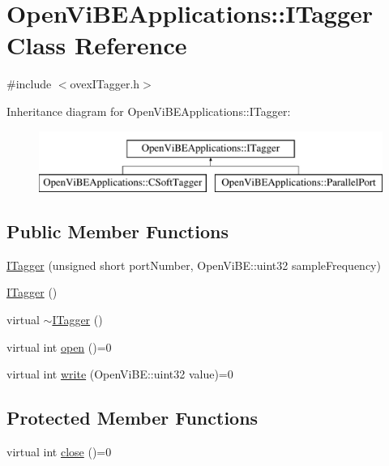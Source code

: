 \hypertarget{classOpenViBEApplications_1_1ITagger}{
\section{OpenViBEApplications::ITagger Class Reference}
\label{classOpenViBEApplications_1_1ITagger}
}


{\ttfamily \#include $<$ovexITagger.h$>$}

Inheritance diagram for OpenViBEApplications::ITagger:\begin{figure}[H]
\begin{center}
\leavevmode
\includegraphics[height=2.000000cm]{classOpenViBEApplications_1_1ITagger}
\end{center}
\end{figure}
\subsection*{Public Member Functions}
\begin{DoxyCompactItemize}
\item 
\hyperlink{classOpenViBEApplications_1_1ITagger_a14f2dcca4be4704a8cb52a1003d57281}{ITagger} (unsigned short portNumber, OpenViBE::uint32 sampleFrequency)
\item 
\hyperlink{classOpenViBEApplications_1_1ITagger_a0d04c92ea172447491a3896aed3ce86b}{ITagger} ()
\item 
virtual \hyperlink{classOpenViBEApplications_1_1ITagger_a89b6346101d38eeac59ce42361d22a17}{$\sim$ITagger} ()
\item 
virtual int \hyperlink{classOpenViBEApplications_1_1ITagger_a9fdb783454b71a6c69db8a1cfc8ebe30}{open} ()=0
\item 
virtual int \hyperlink{classOpenViBEApplications_1_1ITagger_a986aae0747ce120c9fa789bda4ff0178}{write} (OpenViBE::uint32 value)=0
\end{DoxyCompactItemize}
\subsection*{Protected Member Functions}
\begin{DoxyCompactItemize}
\item 
virtual int \hyperlink{classOpenViBEApplications_1_1ITagger_a4be8c6343e35cd485c16d2359402a607}{close} ()=0
\end{DoxyCompactItemize}


